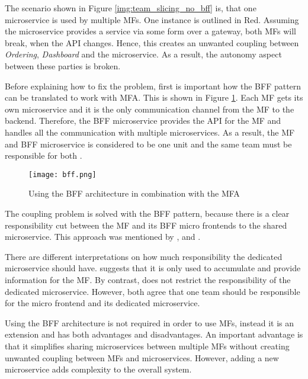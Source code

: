 The scenario shown in Figure \ref{img:team_slicing_no_bff} is, that one microservice is used by multiple \acp{MF}.
One instance is outlined in Red.
Assuming the microservice provides a service via some form over a gateway, both \acp{MF} will break, when the \ac{API} changes.
Hence, this creates an unwanted coupling between \textit{Ordering}, \textit{Dashboard} and the microservice.
As a result, the autonomy aspect between these parties is broken.

Before explaining how to fix the problem, first is important how the \ac{BFF} pattern can be translated to work with \ac{MFA}.
This is shown in Figure \ref{img:team_slicing_bff}.
Each \ac{MF} gets its own microservice and it is the only communication channel from the \ac{MF} to the backend.
Therefore, the \ac{BFF} microservice provides the \ac{API} for the \ac{MF} and handles all the communication with multiple microservices.
As a result, the \ac{MF} and \ac{BFF} microservice is considered to be one unit and the same team must be responsible for both \cite{Leitner.2020}.

\begin{figure}[h]
    \centering
    \texttt{[image: bff.png]}
    \caption{Using the \ac{BFF} architecture in combination with the \ac{MFA} \cite{Leitner.2020}}
    \label{img:team_slicing_bff}
\end{figure}

The coupling problem is solved with the \ac{BFF} pattern, because there is a clear responsibility cut between the \ac{MF} and its \ac{BFF} micro frontends to the shared microservice.
This approach was mentioned by \textcite{Jackson.2019}, \textcite{Leitner.2020} and \textciteRehm{}.

There are different interpretations on how much responsibility the dedicated microservice should have.
\textcite{Leitner.2020} suggests that it is only used to accumulate and provide information for the \ac{MF}.
By contrast, \textcite{Jackson.2019} does not restrict the responsibility of the dedicated microservice.
However, both agree that one team should be responsible for the micro frontend and its dedicated microservice.

Using the \ac{BFF} architecture is not required in order to use \acp{MF}, instead it is an extension and has both advantages and disadvantages.
An important advantage is that it simplifies sharing microservices between multiple \acp{MF} without creating unwanted coupling between \acp{MF} and microservices.
However, adding a new microservice adds complexity to the overall system.



